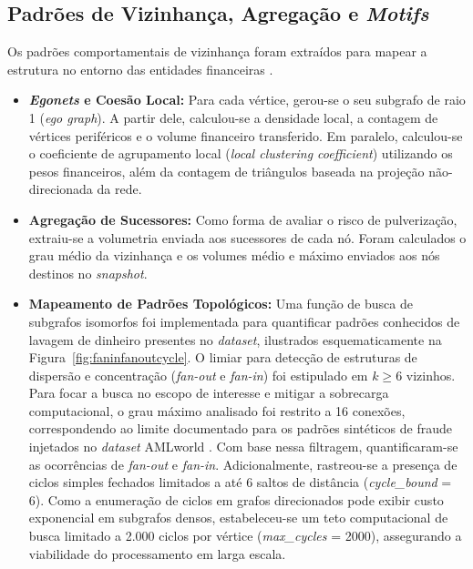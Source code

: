 \documentclass[a4paper,12pt,oneside,onecolumn,final,fleqn]{repUERJ}
\begin{document}
\subsection{Padrões de Vizinhança, Agregação e \textit{Motifs}}

Os padrões comportamentais de vizinhança foram extraídos para mapear a estrutura no entorno das entidades financeiras \cite{dong2025spacegnn}.

\begin{itemize}
    \item \textbf{\textit{Egonets} e Coesão Local:} Para cada vértice, gerou-se o seu subgrafo de raio 1 (\textit{ego graph}). A partir dele, calculou-se a densidade local, a contagem de vértices periféricos e o volume financeiro transferido. Em paralelo, calculou-se o coeficiente de agrupamento local (\textit{local clustering coefficient}) utilizando os pesos financeiros, além da contagem de triângulos baseada na projeção não-direcionada da rede.
    
    \item \textbf{Agregação de Sucessores:} Como forma de avaliar o risco de pulverização, extraiu-se a volumetria enviada aos sucessores de cada nó. Foram calculados o grau médio da vizinhança e os volumes médio e máximo enviados aos nós destinos no \textit{snapshot}.
    
    \item \textbf{Mapeamento de Padrões Topológicos:} Uma função de busca de subgrafos isomorfos foi implementada para quantificar padrões conhecidos de lavagem de dinheiro presentes no \textit{dataset}, ilustrados esquematicamente na Figura~\ref{fig:faninfanoutcycle}. O limiar para detecção de estruturas de dispersão e concentração (\textit{fan-out} e \textit{fan-in}) foi estipulado em $k \ge 6$ vizinhos. Para focar a busca no escopo de interesse e mitigar a sobrecarga computacional, o grau máximo analisado foi restrito a 16 conexões, correspondendo ao limite documentado para os padrões sintéticos de fraude injetados no \textit{dataset} AMLworld \cite{altman2023realistic}. Com base nessa filtragem, quantificaram-se as ocorrências de \textit{fan-out} e \textit{fan-in}. Adicionalmente, rastreou-se a presença de ciclos simples fechados limitados a até 6 saltos de distância (\textit{cycle\_bound} = 6). Como a enumeração de ciclos em grafos direcionados pode exibir custo exponencial em subgrafos densos, estabeleceu-se um teto computacional de busca limitado a 2.000 ciclos por vértice (\textit{max\_cycles} = 2000), assegurando a viabilidade do processamento em larga escala.
\end{itemize}
\end{document}
